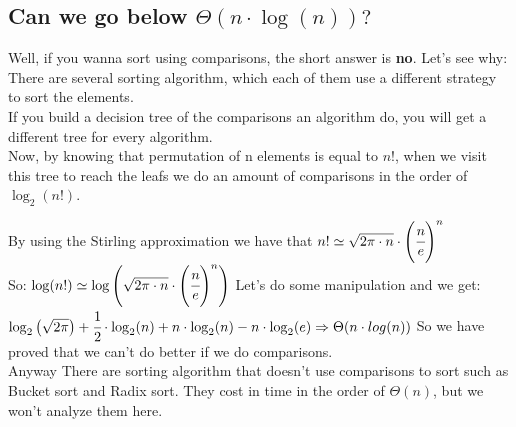\documentclass{article}
\begin{document}
\subsection{Can we go below $\Theta(n\cdot \log(n))?$}
Well, if you wanna sort using comparisons, the short answer is \textbf{no}. Let's see why:\\
There are several sorting algorithm, which each of them use a different strategy to sort the elements.\\
If you build a decision tree of the comparisons an algorithm do, you will get a different tree for every algorithm.\\
Now, by knowing that permutation of n elements is equal to $n!$, when we visit this tree to reach the leafs we do an amount of comparisons in the order of $\log_2(n!)$.\\
\begin{large}
By using the Stirling approximation we have that $n! \simeq \sqrt{2\pi \cdot n} \cdot \left(\cfrac{n}{e}\right)^n$\\
So: $\log(n!) \simeq \log\left(\sqrt{2\pi \cdot n} \cdot \left(\cfrac{n}{e}\right)^n\right)$
Let's do some manipulation and we get:\\
$\log_2\left(\sqrt{2\pi}\right) + \cfrac{1}{2}\cdot \log_2(n) + n\cdot \log_2(n) - n\cdot \log_2(e) \Rightarrow \Theta(n\cdot log(n))$
So we have proved that we can't do better if we do comparisons.\\
Anyway There are sorting algorithm that doesn't use comparisons to sort such as Bucket sort and Radix sort. They cost in time in the order of $\Theta(n)$, but we won't analyze them here.\\
\end{large}
\end{document}
